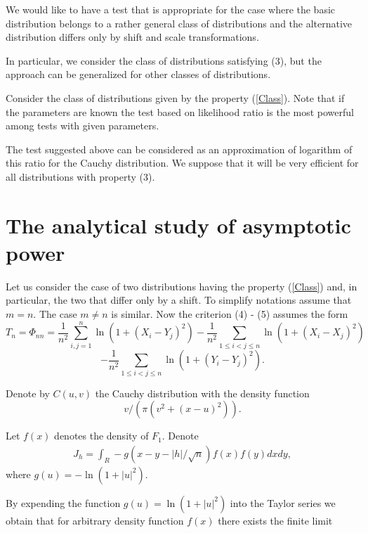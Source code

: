 \documentclass{svproc}
\begin{document}
We would like to have a test that is appropriate for the case where the  basic distribution belongs to a rather general class of distributions and the alternative distribution  differs only by shift and scale transformations.


In particular, we consider the class of distributions satisfying (3), but the approach can be generalized for other classes of distributions.

Consider the class of distributions given by the property (\ref{Class}). Note that if the parameters are known the test based on likelihood ratio is the most powerful among tests with given parameters.


The test suggested above can be considered as an approximation of logarithm of this ratio for the Cauchy distribution. We suppose that it will be very efficient for all distributions with property (3).





\section{The analytical study of asymptotic power}
\label{S:2}

Let us consider the case of two distributions having the property (\ref{Class}) and, in particular, the two that differ only by a shift. To simplify notations assume that $m=n$. The case $m\ne n$ is similar.
Now the criterion  (4) - (5)  assumes the form
\begin{equation}
T_n=\Phi_{nn}= \frac{1}{n^2}\sum_{i,j=1}^n \ln(1 + (X_i - Y_j)^2)-\frac{1}{n^2}\sum_{1\leq i<j\leq n}  \ln(1 + (X_i - X_j)^2)
\end{equation}
\begin{equation}
-  \frac{1}{n^2}\sum_{1\leq i<j\leq n}  \ln(1 + (Y_i - Y_j)^2).
\end{equation}

Denote by $C(u,v)$ the Cauchy distribution with the density function
$$
v/(\pi(v^2 + (x-u)^2)).
$$

Let $f(x)$ denotes the density of $F_1$.
Denote
\begin{eqnarray*}
J_h =\int_R -g(x-y-|h|/\sqrt{n})f(x)f(y)dxdy,
\end{eqnarray*}
where $g(u)= - \ln (1+|u|^2)$.

 By expending the function $g(u)= \ln (1+|u|^2)$ into the Taylor series we obtain that for arbitrary density function $f(x)$ there exists the finite limit 
\end{document}
